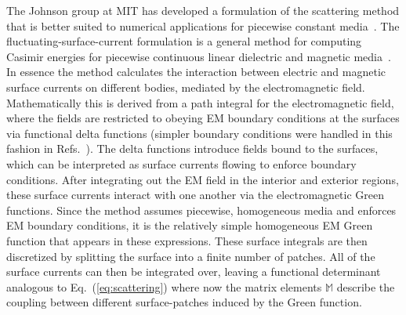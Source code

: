 The Johnson group at MIT has developed a formulation of the scattering method that is better suited to numerical 
applications for piecewise constant media~\cite{Rodriguez2007,Rodriguez2007a, Rodriguez2009,Reid2009,Reid2011, Reid2013}.  
The fluctuating-surface-current formulation is a general method for computing Casimir
energies for piecewise continuous linear dielectric and magnetic media~\cite{Reid2009,Reid2011, Reid2013}.  
In essence the method calculates the interaction between electric and magnetic surface currents 
on different bodies, mediated by the electromagnetic field.  Mathematically this is derived 
from a path integral for the electromagnetic field, where the fields are restricted to obeying EM boundary conditions at the 
surfaces via functional delta functions (simpler boundary conditions were handled in this fashion in
Refs.~\cite{Bordag1985,Li1991}).  The delta functions introduce fields 
bound to the surfaces, which can be interpreted as surface currents flowing to enforce boundary conditions.
After integrating out the EM field in the interior and exterior regions, 
these surface currents interact with one another via the electromagnetic Green functions.
Since the method assumes piecewise, homogeneous media and enforces EM boundary
conditions, it is the relatively simple homogeneous EM Green function that appears in these expressions.
These surface integrals are then discretized by splitting the surface into a finite number of patches.
All of the surface currents can then be integrated over, leaving a functional determinant analogous to Eq.~(\ref{eq:scattering})
where now the matrix elements $\mathbb{M}$ describe the coupling between different surface-patches induced
by the Green function.  

